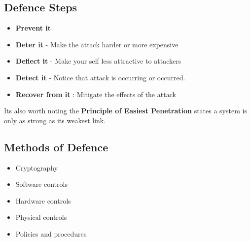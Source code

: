 \documentclass[twoside]{article}
\begin{document}
\subsection{Defence Steps}
\begin{itemize}
\item \textbf{Prevent it} 
\item \textbf{Deter it} - Make the attack harder or more expensive
\item \textbf{Deflect it} - Make your self less attractive to attackers
\item \textbf{Detect it} - Notice that attack is occurring or occurred. 
\item \textbf{Recover from it} : Mitigate the effects of the attack
\end{itemize}

Its also worth noting the \textbf{Principle of Easiest Penetration} states a system is only as strong as its weakest link.

\subsection{Methods of Defence}

\begin{itemize}
\item Cryptography
\item Software controls
\item Hardware controls
\item Physical controls
\item Policies and procedures
\end{itemize}
\end{document}
